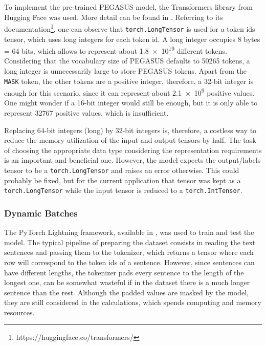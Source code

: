 \documentclass[a4paper, 10pt]{article}
\newcommand{\code}[1]{\texttt{#1}}
\begin{document}
            To implement the pre-trained PEGASUS model, the Transformers library from Hugging Face was used. More detail can be found in \cite{Wolf2020}. Referring to its documentation\footnote{https://huggingface.co/transformers/}, one can observe that \code{torch.LongTensor} is used for a token ids tensor, which uses long integers for each token id. A long integer occupies 8 bytes = 64 bits, which allows to represent about \num{1.8e19} different tokens. Considering that the vocabulary size of PEGASUS defaults to 50265 tokens, a long integer is unnecessarily large to store PEGASUS tokens. Apart from the \code{MASK} token, the other tokens are a positive integer, therefore, a 32-bit integer is enough for this scenario, since it can represent about \num{2.1e9} positive values. One might wonder if a 16-bit integer would still be enough, but it is only able to represent 32767 positive values, which is insufficient.
            
            Replacing 64-bit integers (long) by 32-bit integers is, therefore, a costless way to reduce the memory utilization of the input and output tensors by half. The task of choosing the appropriate data type considering the representation requirements is an important and beneficial one. However, the model expects the output/labels tensor to be a \code{torch.LongTensor} and raises an error otherwise. This could probably be fixed, but for the current application that tensor was kept as a \code{torch.LongTensor} while the input tensor is reduced to a \code{torch.IntTensor}.
            
        \subsubsection{Dynamic Batches}
        
            The PyTorch Lightning framework, available in \cite{Falcon2019}, was used to train and test the model. The typical pipeline of preparing the dataset consists in reading the text sentences and passing them to the tokenizer, which returns a tensor where each row will correspond to the token ids of a sentence. However, since sentences can have different lengths, the tokenizer pads every sentence to the length of the longest one, can be somewhat wasteful if in the dataset there is a much longer sentence than the rest. Although the padded values are masked by the model, they are still considered in the calculations, which spends computing and memory resources.
            
\end{document}
